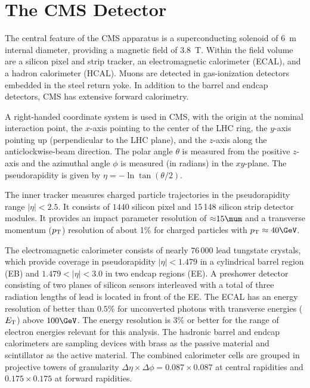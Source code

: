 \section{The CMS Detector}
\label{sec:detector}
\par
The central feature of the CMS apparatus
is a superconducting solenoid of 6~m internal diameter, providing
a magnetic field of $3.8$~T. Within the field volume are a silicon pixel
and strip tracker, an electromagnetic calorimeter (ECAL),
and a hadron calorimeter (HCAL). Muons are detected
in gas-ionization detectors embedded in the steel return
yoke. In addition to the barrel and endcap detectors, CMS has
extensive forward calorimetry.
\par
A right-handed coordinate system is used in CMS, with the origin at the
nominal interaction point, the $x$-axis pointing to the center of
the LHC ring, the $y$-axis pointing up (perpendicular to the LHC plane),
and the $z$-axis along the anticlockwise-beam direction. The polar
angle $\theta$ is measured from the positive $z$-axis and the
azimuthal angle $\phi$ is measured (in radians) in the $xy$-plane.
The pseudorapidity is given by $\eta = -\ln\tan(\theta/2)$.
\par
The inner tracker measures charged particle trajectories in the
pseudorapidity range $|\eta| < 2.5$.   It consists of $1440$ silicon
pixel and 15\,148 silicon strip detector modules.  It provides an
impact parameter resolution of ${\approx}15\mum$ and a transverse
momentum ($p_{\mathrm{T}}$) resolution of about 1\% for charged particles
with $\pt \approx 40\GeV$.
\par
The electromagnetic calorimeter consists of nearly $76\,000$ lead tungstate
crystals, which provide coverage in pseudorapidity $|\eta| < 1.479$ in a
cylindrical barrel region (EB) and $1.479 < |\eta| < 3.0$ in two endcap
regions (EE).
A preshower detector
consisting of two planes of silicon sensors interleaved with a total of
three radiation lengths of lead is located in front of the EE.
The ECAL has an energy resolution of better than $0.5\%$ for
unconverted photons with transverse energies ($E\,\,_{\!\!\!\mathrm{T}}$) above $100\GeV$.
The energy resolution is $3\%$ or better for the range of
electron energies relevant for this analysis.
The hadronic barrel and endcap calorimeters are sampling devices with brass
as the passive material and scintillator as the active material.
The combined calorimeter cells are grouped in projective towers of granularity
$\Delta \eta \times \Delta \phi = 0.087\times0.087$ at central rapidities
and $0.175\times0.175$ at forward rapidities.
